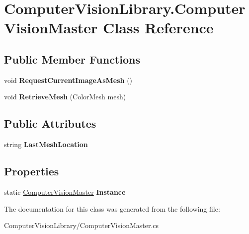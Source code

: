 \hypertarget{class_computer_vision_library_1_1_computer_vision_master}{}\section{Computer\+Vision\+Library.\+Computer\+Vision\+Master Class Reference}
\label{class_computer_vision_library_1_1_computer_vision_master}
\subsection*{Public Member Functions}
\begin{DoxyCompactItemize}
\item 
\hypertarget{class_computer_vision_library_1_1_computer_vision_master_ada2dc4f967b6445f15402529fd92f326}{}\label{class_computer_vision_library_1_1_computer_vision_master_ada2dc4f967b6445f15402529fd92f326} 
void {\bfseries Request\+Current\+Image\+As\+Mesh} ()
\item 
\hypertarget{class_computer_vision_library_1_1_computer_vision_master_a68d823632038d891aecda1e59f1435ea}{}\label{class_computer_vision_library_1_1_computer_vision_master_a68d823632038d891aecda1e59f1435ea} 
void {\bfseries Retrieve\+Mesh} (Color\+Mesh mesh)
\end{DoxyCompactItemize}
\subsection*{Public Attributes}
\begin{DoxyCompactItemize}
\item 
\hypertarget{class_computer_vision_library_1_1_computer_vision_master_a458d3174af2f9c2ec669b8cffc1b6ae7}{}\label{class_computer_vision_library_1_1_computer_vision_master_a458d3174af2f9c2ec669b8cffc1b6ae7} 
string {\bfseries Last\+Mesh\+Location}
\end{DoxyCompactItemize}
\subsection*{Properties}
\begin{DoxyCompactItemize}
\item 
\hypertarget{class_computer_vision_library_1_1_computer_vision_master_a474cec41ba592341899c080ba14663eb}{}\label{class_computer_vision_library_1_1_computer_vision_master_a474cec41ba592341899c080ba14663eb} 
static \hyperlink{class_computer_vision_library_1_1_computer_vision_master}{Computer\+Vision\+Master} {\bfseries Instance}
\end{DoxyCompactItemize}


The documentation for this class was generated from the following file\+:\begin{DoxyCompactItemize}
\item 
Computer\+Vision\+Library/Computer\+Vision\+Master.\+cs\end{DoxyCompactItemize}
